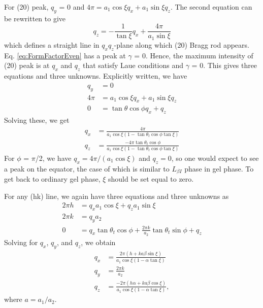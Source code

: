 For (20) peak, $q_y$ = 0 and $4\pi=a_1\cos\xi q_x+a_1\sin\xi q_z$. The second equation can be rewritten to give
\begin{equation}
	q_z=-\frac{1}{\tan\xi}q_x+\frac{4\pi}{a_1\sin\xi}
\end{equation}
which defines a straight line in $q_xq_z$-plane along which (20) Bragg rod appears. Eq. \ref{eq:FormFactorEven} has a peak at $\gamma$ = 0. Hence, the maximum intensity of (20) peak is at $q_x$ and $q_z$ that satisfy Laue conditions and $\gamma$ = 0. This gives three equations and three unknowns. Explicitly written, we have
\begin{align}
	q_y &= 0\\
	4\pi &= a_1\cos\xi q_x+a_1\sin\xi q_z\\
	0 &= \tan\theta\cos\phi q_x+q_z
\end{align}
Solving these, we get
\begin{align}%
	q_x &= \frac{4\pi}{a_1\cos\xi(1-\tan\theta_t\cos\phi\tan\xi)}\\
	q_z &= \frac{-4\pi\tan\theta_t\cos\phi}{a_1\cos\xi(1-\tan\theta_t\cos\phi\tan\xi)}
\end{align}
For $\phi$ = $\pi$/2, we have $q_x=4\pi/(a_1\cos\xi)$ and $q_z=0$, so one would expect to see a peak on the equator, the case of which is similar to $L_{\beta I}$ phase in gel phase. To get back to ordinary gel phase, $\xi$ should be set equal to zero.

For any (hk) line, we again have three equations and three unknowns as
\begin{align}
	2\pi h &= q_xa_1\cos\xi +q_za_1\sin\xi\\
	2\pi k &= q_ya_2\\
	0 &= q_x\tan\theta_t\cos\phi + \frac{2\pi k}{a_2}\tan\theta_t\sin\phi +q_z
\end{align}
Solving for $q_x$, $q_y$, and $q_z$, we obtain
\begin{align}
	q_x &= \frac{2\pi(h+ka\beta\sin\xi)}{a_1\cos\xi(1-\alpha\tan\xi)}\\
	q_y &= \frac{2\pi k}{a_2}\\
	q_z &= \frac{-2\pi(h\alpha+ka\beta\cos\xi)}{a_1\cos\xi(1-\alpha\tan\xi)},
\end{align}
where $a=a_1/a_2$.
